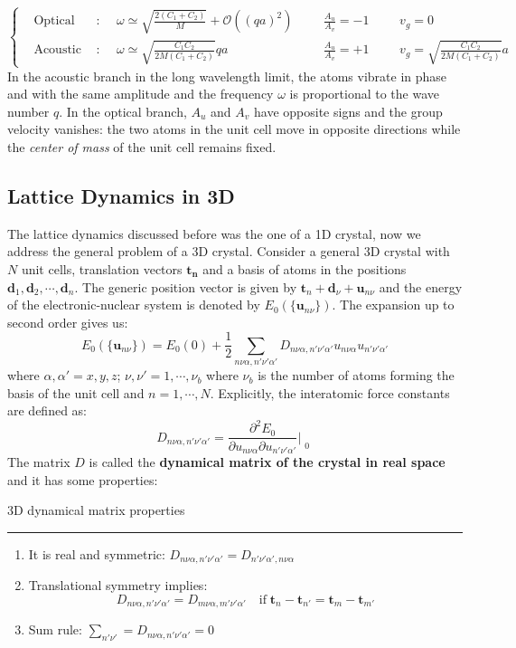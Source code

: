 \documentclass[10.75pt,a4paper,openright,bottom=2cm]{article}
\renewcommand{\Vec}[1]{\boldsymbol{#1}}
\begin{document}
\[
\left\{
\begin{aligned}
&\text{Optical branch}: &&\omega\simeq\sqrt{\frac{2(C_1+C_2)}{M}}+\mathcal{O}((qa)^2) &&&\frac{A_u}{A_v}=-1 &&&v_g=0\\
&\text{Acoustic branch}: &&\omega\simeq\sqrt{\frac{C_1C_2}{2M(C_1+C_2)}}qa &&&\frac{A_u}{A_v}=+1 &&&v_g=\sqrt{\frac{C_1C_2}{2M(C_1+C_2)}}a
\end{aligned}
\right.
\]
In the acoustic branch in the long wavelength limit, the atoms vibrate in phase and with the same amplitude and the frequency $\omega$ is proportional to the wave number $q$. In the optical branch, $A_u$ and $A_v$ have opposite signs and the group velocity vanishes: the two atoms in the unit cell move in opposite directions while the \textit{center of mass} of the unit cell remains fixed.
\subsection{Lattice Dynamics in 3D}
The lattice dynamics discussed before was the one of a 1D crystal, now we address the general problem of a 3D crystal. Consider a general 3D crystal with $N$ unit cells, translation vectors $\Vec{t_n}$ and a basis of atoms in the positions $\Vec{d}_1,\Vec{d}_2,\cdots,\Vec{d}_n$. The generic position vector is given by $\Vec{t}_n+\Vec{d}_\nu+\Vec{u}_{n\nu}$ and the energy of the electronic-nuclear system is denoted by $E_0(\{\Vec{u}_{n\nu}\})$. The expansion up to second order gives us:
\[
E_0(\{\Vec{u}_{n\nu}\})=E_0(0)+\frac{1}{2}\sum_{n\nu\alpha,n'\nu'\alpha'}D_{n\nu\alpha,n'\nu'\alpha'}u_{n\nu\alpha}u_{n'\nu'\alpha'}
\]
where $\alpha,\alpha'=x,y,z$; $\nu,\nu'=1,\cdots,\nu_b$ where $\nu_b$ is the number of atoms forming the basis of the unit cell and $n=1,\cdots,N$. Explicitly, the interatomic force constants are defined as:
\[
D_{n\nu\alpha,n'\nu'\alpha'}=\frac{\partial^2E_0}{\partial u_{n\nu\alpha}\partial u_{n'\nu'\alpha'}}\Bigr|_{\substack{0}}
\]
The matrix $D$ is called the \textbf{dynamical matrix of the crystal in real space} and it has some properties:
\begin{mybox}
3D dynamical matrix properties
\hrule
\begin{enumerate}\renewcommand{\labelenumi}{\arabic{enumi})}
    \item It is real and symmetric: $D_{n\nu\alpha,n'\nu'\alpha'}=D_{n'\nu'\alpha',n\nu\alpha}$
    \item Translational symmetry implies: 
    \[
    D_{n\nu\alpha,n'\nu'\alpha'}=D_{m\nu\alpha,m'\nu'\alpha'} \quad\text{if}\; \Vec{t}_n-\Vec{t}_{n'}=\Vec{t}_m-\Vec{t}_{m'}
    \]
    \item Sum rule: $\sum_{n'\nu'}=D_{n\nu\alpha,n'\nu'\alpha'}=0$
\end{enumerate}
\end{mybox}
\end{document}
